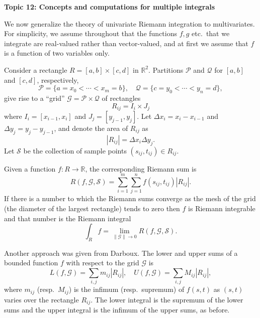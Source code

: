 \documentclass[11pt]{article}
\begin{document}
\begin{center}
  \textbf{Topic 12: Concepts and computations for multiple integrals} 
\end{center}

We now generalize the theory of univariate Riemann integration to multivariates.
For simplicity, we assume throughout that the functions $f, g$ etc.\ that we integrate are real-valued rather than vector-valued, and at first we assume that $f$ is a function of two variables only.

Consider a rectangle $R = [a,b] \times [c,d]$ in $\mathbb{R}^2$.  Partitions $\mathcal{P}$ and $\mathcal{Q}$ for $[a,b]$ and $[c,d]$, respectively,
\[
  \mathcal{P} = \{ a = x_0 < \cdots < x_m = b \}, \quad
  \mathcal{Q} = \{ c = y_0 < \cdots < y_n = d \},
\]
give rise to a ``grid'' $\mathcal{G} = \mathcal{P} \times \mathcal{Q}$ of rectangles
\[
  R_{ij} = I_i \times J_j
\]
where $I_i = [x_{i-1},x_i]$ and $J_j = [y_{j-1},y_j]$.
Let $\Delta x_i = x_i - x_{i-1}$ and $\Delta y_j = y_j - y_{j-1}$, and denote the area of $R_{ij}$ as
\[
  |R_{ij}| = \Delta x_i \Delta y_j.
\]
Let $\mathcal{S}$ be the collection of sample points $(s_{ij},t_{ij}) \in R_{ij}$.

Given a function $f: R \to \mathbb{R}$, the corresponding Riemann sum is
\[
  R(f,\mathcal{G},\mathcal{S}) = \sum_{i=1}^m \sum_{j=1}^n f(s_{ij}, t_{ij}) |R_{ij}|.
\]
If there is a number to which the Riemann sums converge as the mesh of the grid (the diameter of the largest rectangle) tends to zero then $f$ is Riemann integrable and that number is the Riemann integral
\[
  \int_R f = \lim_{\|\mathcal{G}\|\to0} R(f,\mathcal{G},\mathcal{S}).
\]

Another approach was given from Darboux.  The lower and upper sums of a bounded function $f$ with respect to the grid $\mathcal{G}$ is
\[
  L(f,\mathcal{G}) = \sum_{i,j} m_{ij} |R_{ij}|, \quad U(f,\mathcal{G}) = \sum_{i,j} M_{ij} |R_{ij}|,
\]
where $m_{ij}$ (resp.\ $M_{ij}$) is the infimum (resp.\ supremum) of $f(s,t)$ as $(s,t)$ varies over the rectangle $R_{ij}$.
The lower integral is the supremum of the lower sums and the upper integral is the infimum of the upper sums, as before.
\end{document}
